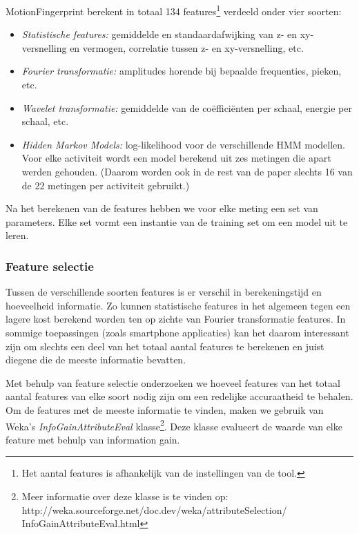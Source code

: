 \documentclass{article}
\begin{document}
MotionFingerprint berekent in totaal 134 features\footnote{Het aantal features is afhankelijk van de instellingen van de tool.} verdeeld onder vier soorten:
\begin{itemize}
\item \textit{Statistische features:} gemiddelde en standaardafwijking van z- en xy-versnelling en vermogen, correlatie tussen z- en xy-versnelling, etc. 
 
\item \textit{Fourier transformatie:} amplitudes horende bij bepaalde frequenties, pieken, etc.

\item \textit{Wavelet transformatie:} gemiddelde van de co\"effici\"enten per schaal, energie per schaal, etc.

\item \textit{Hidden Markov Models:} log-likelihood voor de verschillende HMM modellen. Voor elke activiteit wordt een model berekend uit zes metingen die apart werden gehouden. (Daarom worden ook in de rest van de paper slechts 16 van de 22 metingen per activiteit gebruikt.)
\end{itemize}


Na het berekenen van de features hebben we voor elke meting een set van parameters. Elke set vormt een instantie van de training set om een model uit te leren.

\subsubsection{Feature selectie}
Tussen de verschillende soorten features is er verschil in berekeningstijd en hoeveelheid informatie. Zo kunnen statistische features in het algemeen tegen een lagere kost berekend worden ten op zichte van Fourier transformatie features. In sommige toepassingen (zoals smartphone applicaties) kan het daarom interessant zijn om slechts een deel van het totaal aantal features te berekenen en juist diegene die de meeste informatie bevatten.

Met behulp van feature selectie onderzoeken we hoeveel features van het totaal aantal features van elke soort nodig zijn om een redelijke accuraatheid te behalen. Om de features met de meeste informatie te vinden, maken we gebruik van Weka's \emph{InfoGainAttributeEval} klasse\footnote{Meer informatie over deze klasse is te vinden op: http://weka.sourceforge.net/doc.dev/weka/attributeSelection/
InfoGainAttributeEval.html}.
 Deze klasse evalueert de waarde van elke feature met behulp van information gain.
\end{document}
